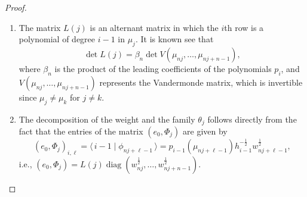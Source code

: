 \documentclass[a4paper,reqno]{amsart}
\DeclareMathOperator{\diag}{diag}
\theoremstyle{definition}
\numberwithin{equation}{section}
\newcommand{\bra}[1]{\langle\,{#1}}
\newcommand{\ket}[1]{\mid{#1}\,\rangle}
\begin{document}
\begin{proof}
\begin{enumerate}
\item The matrix $L(j)$ is an alternant matrix in which the $i$th row is a polynomial of degree  $i-1$ in $\mu_j$. It is known see \cite{Muir} that
$$\det L(j)=\beta_n \det V(\mu_{nj},\ldots, \mu_{nj+n-1}),$$
where $\beta_n$ is the product of the leading coefficients of the  polynomials $p_i$, and $V(\mu_{nj},\ldots, \mu_{nj+n-1})$ represents the Vandermonde matrix, which is invertible since $\mu_j\neq\mu_k$ for $j\neq k$.
\item The decomposition of the weight and the family $\theta_j$ follows directly from  the fact that the entries of the matrix $(e_0,\Phi_j)$ are given by
\begin{equation}
(e_0,\Phi_j)_{i,\ell}=\bra{i-1}\ket{\phi_{nj+\ell-1}}=p_{i-1}(\mu_{nj+\ell-1})h_{i-1}^{-\frac12}w^\frac12_{nj+\ell-1},    
\end{equation}
i.e., $(e_0,\Phi_j)=L(j)\diag(w_{nj}^\frac12,\ldots,w_{nj+n-1}^\frac12).$


\end{enumerate}
\end{proof}
\end{document}
